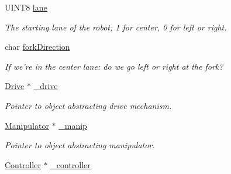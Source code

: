 \begin{DoxyCompactItemize}
\item 
\hypertarget{class_r_j_f_r_c2011_1_1_autonomous_a250e8a5a9a38ae5bba7457df67e05462}{
UINT8 \hyperlink{class_r_j_f_r_c2011_1_1_autonomous_a250e8a5a9a38ae5bba7457df67e05462}{lane}}
\label{class_r_j_f_r_c2011_1_1_autonomous_a250e8a5a9a38ae5bba7457df67e05462}

\begin{DoxyCompactList}\small\item\em The starting lane of the robot; 1 for center, 0 for left or right. \item\end{DoxyCompactList}\item 
\hypertarget{class_r_j_f_r_c2011_1_1_autonomous_abcfa4840dd66568b3e263a36d9941bbc}{
char \hyperlink{class_r_j_f_r_c2011_1_1_autonomous_abcfa4840dd66568b3e263a36d9941bbc}{forkDirection}}
\label{class_r_j_f_r_c2011_1_1_autonomous_abcfa4840dd66568b3e263a36d9941bbc}

\begin{DoxyCompactList}\small\item\em If we're in the center lane: do we go left or right at the fork? \item\end{DoxyCompactList}\item 
\hypertarget{class_r_j_f_r_c2011_1_1_autonomous_a15f4f4554332e90259e12aec3baa827b}{
\hyperlink{class_r_j_f_r_c2011_1_1_drive}{Drive} $\ast$ \hyperlink{class_r_j_f_r_c2011_1_1_autonomous_a15f4f4554332e90259e12aec3baa827b}{\_\-drive}}
\label{class_r_j_f_r_c2011_1_1_autonomous_a15f4f4554332e90259e12aec3baa827b}

\begin{DoxyCompactList}\small\item\em Pointer to object abstracting drive mechanism. \item\end{DoxyCompactList}\item 
\hypertarget{class_r_j_f_r_c2011_1_1_autonomous_acaeb4cd9803595987b7fa237247ecd70}{
\hyperlink{class_r_j_f_r_c2011_1_1_manipulator}{Manipulator} $\ast$ \hyperlink{class_r_j_f_r_c2011_1_1_autonomous_acaeb4cd9803595987b7fa237247ecd70}{\_\-manip}}
\label{class_r_j_f_r_c2011_1_1_autonomous_acaeb4cd9803595987b7fa237247ecd70}

\begin{DoxyCompactList}\small\item\em Pointer to object abstracting manipulator. \item\end{DoxyCompactList}\item 
\hypertarget{class_r_j_f_r_c2011_1_1_autonomous_ad5f5bd5da92e33c84b1227d98fe9db47}{
\hyperlink{class_r_j_f_r_c2011_1_1_controller}{Controller} $\ast$ \hyperlink{class_r_j_f_r_c2011_1_1_autonomous_ad5f5bd5da92e33c84b1227d98fe9db47}{\_\-controller}}
\label{class_r_j_f_r_c2011_1_1_autonomous_ad5f5bd5da92e33c84b1227d98fe9db47}


\end{DoxyCompactItemize}
